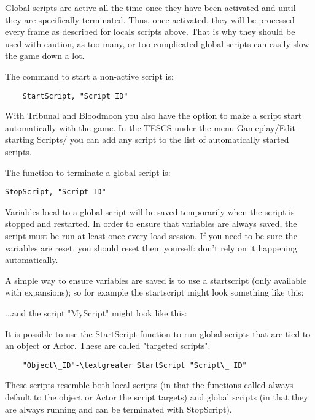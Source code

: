 Global scripts are active all the time once they have been activated and
until they are specifically terminated. Thus, once activated, they will
be processed every frame as described for locals scripts above. That is
why they should be used with caution, as too many, or too complicated
global scripts can easily slow the game down a lot.

The command to start a non-active script is:

\begin{lstlisting}
	StartScript, "Script ID"
\end{lstlisting}

With Tribunal and Bloodmoon you also have the option to make a script
start automatically with the game. In the TESCS under the menu
Gameplay/Edit starting Scripts/ you can add any script to the list of
automatically started scripts.

The function to terminate a global script is:

\begin{lstlisting}
StopScript, "Script ID"
\end{lstlisting}

Variables local to a global script will be saved temporarily when the
script is stopped and restarted. In order to ensure that variables are
always saved, the script must be run at least once every load session.
If you need to be sure the variables are reset, you should reset them
yourself: don't rely on it happening automatically.

A simple way to ensure variables are saved is to use a startscript (only
available with expansions); so for example the startscript might look
something like this:



...and the script "MyScript" might look like this:



It is possible to use the StartScript function to run global scripts
that are tied to an object or Actor. These are called "targeted
scripts".

\begin{lstlisting}
	"Object\_ID"-\textgreater StartScript "Script\_ ID"
\end{lstlisting}

These scripts resemble both local scripts (in that the functions called
always default to the object or Actor the script targets) and global
scripts (in that they are always running and can be terminated with
StopScript).

